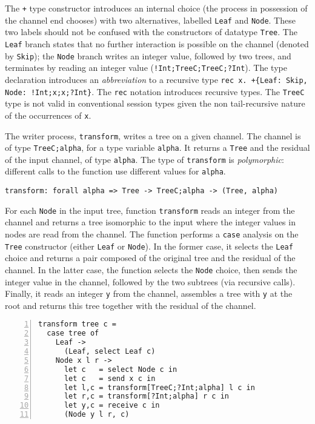 The \lstinline|+| type constructor introduces an internal choice (the
process in possession of the channel end chooses) with two
alternatives, labelled \lstinline|Leaf| and \lstinline|Node|. These
two labels should not be confused with the constructors of datatype
\lstinline|Tree|. The \lstinline|Leaf| branch states that no further
interaction is possible on the channel (denoted by \lstinline|Skip|);
the \lstinline|Node| branch writes an integer value, followed by two
trees, and terminates by reading an integer value
(\lstinline|!Int;TreeC;TreeC;?Int|).
%
The type declaration introduces an \emph{abbreviation} to a recursive
type \lstinline|rec x. +{Leaf: Skip, Node: !Int;x;x;?Int}|.
%
The \lstinline|rec| notation introduces recursive types. The
\lstinline|TreeC| type is not valid in conventional session types
given the non tail-recursive nature of the occurrences of
\lstinline|x|.


The writer process, \lstinline|transform|, writes a tree on a given
channel. The channel is of type \lstinline|TreeC;alpha|, for
a type variable \lstinline|alpha|. It returns a \lstinline|Tree| and
the residual of the input channel, of type \lstinline|alpha|. The type
of \lstinline|transform| is \emph{polymorphic}: different calls to the
function use different values for \lstinline|alpha|.

\begin{lstlisting}
transform: forall alpha => Tree -> TreeC;alpha -> (Tree, alpha)
\end{lstlisting}

For each \lstinline|Node| in the input tree, function
\lstinline|transform| reads an integer from the channel and returns a
tree isomorphic to the input where the integer values in nodes are
read from the channel.
%
The function performs a \lstinline|case| analysis on the
\lstinline|Tree| constructor (either \lstinline|Leaf| or
\lstinline|Node|). In the former case, it selects the \lstinline|Leaf|
choice and returns a pair composed of the original tree and the
residual of the channel. In the latter case, the function selects the
\lstinline|Node| choice, then sends the integer value in the channel,
followed by the two subtrees (via recursive calls). Finally, it reads
an integer \lstinline|y| from the channel, assembles a tree with
\lstinline|y| at the root and returns this tree together with the
residual of the channel.
%
\begin{lstlisting}[numbers=left]
transform tree c =
  case tree of
    Leaf ->
      (Leaf, select Leaf c)
    Node x l r ->
      let c   = select Node c in
      let c   = send x c in
      let l,c = transform[TreeC;?Int;alpha] l c in
      let r,c = transform[?Int;alpha] r c in
      let y,c = receive c in
      (Node y l r, c)
\end{lstlisting}

